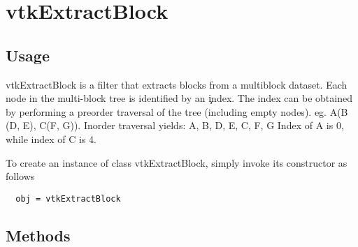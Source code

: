 \section{vtkExtractBlock}

\subsection{Usage}

 vtkExtractBlock is a filter that extracts blocks from a multiblock dataset.
 Each node in the multi-block tree is identified by an \c index. The index can
 be obtained by performing a preorder traversal of the tree (including empty 
 nodes). eg. A(B (D, E), C(F, G)). 
 Inorder traversal yields: A, B, D, E, C, F, G
 Index of A is 0, while index of C is 4.

To create an instance of class vtkExtractBlock, simply
invoke its constructor as follows
\begin{verbatim}
  obj = vtkExtractBlock
\end{verbatim}
\subsection{Methods}

